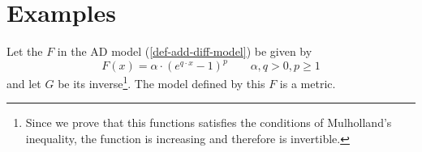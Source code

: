 \section{Examples} \label{sec-ad-ex}
\newcommand\p{q}
\renewcommand\r{p}
\newcommand\q{\alpha}

\begin{ex}\label{def-p-exp-metric-family} 
	Let the $F$ in the AD model (\cref{def-add-diff-model}) be given by
	\begin{equation}\label{def-p-exp-eq}
		F(x) = \q \cdot (e^{\p \cdot x} - 1)^\r \qquad \q, \p > 0, \r \geq 1
	\end{equation}
  and let $G$ be its inverse\footnote{Since we prove that this functions satisfies the conditions of Mulholland's inequality, the function is increasing and therefore is invertible.}.
	The model defined by this $F$ is a metric.
\end{ex}

